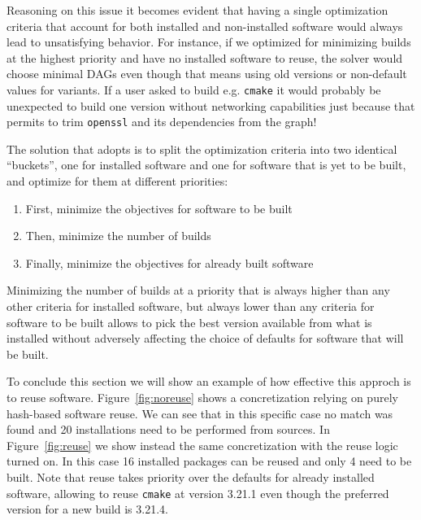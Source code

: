 Reasoning on this issue it becomes evident that having a single optimization criteria that account for both installed and non-installed software would always lead to unsatisfying behavior. For instance, if we optimized for minimizing builds at the highest priority and have no installed software to reuse, the solver would choose minimal DAGs even though that means using old versions or non-default values for variants. If a user asked to build e.g. \texttt{cmake} it would probably be unexpected to build one version without networking capabilities just because that permits to trim \texttt{openssl} and its dependencies from the graph!

The solution that \spack{} adopts is to split the optimization criteria into two identical ``buckets'', one for installed software and one for software that is yet to be built, and optimize for them at different priorities:
\begin{enumerate}
\item First, minimize the objectives for software to be built
\item Then, minimize the number of builds
\item Finally, minimize the objectives for already built software
\end{enumerate}
Minimizing the number of builds at a priority that is always higher than any other criteria for installed software, but always lower than any criteria for software to be built allows \spack{} to pick the best version available from what is installed without adversely affecting the choice of defaults for software that will be built.

To conclude this section we will show an example of how effective this approch is to reuse software. Figure~\ref{fig:noreuse} shows a concretization relying on purely hash-based software reuse. We can see that in this specific case no match was found and 20 installations need to be performed from sources. In Figure~\ref{fig:reuse} we show instead the same concretization with the reuse logic turned on. In this case 16 installed packages can be reused and only 4 need to be built. Note that reuse takes priority over the defaults for already installed software, allowing \spack{} to reuse \texttt{cmake} at version 3.21.1 even though the preferred version for a new build is 3.21.4.

